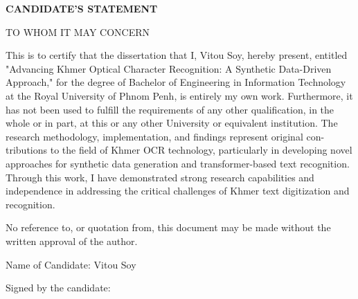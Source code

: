 \begin{adjustwidth}{0.2cm}{0.2cm}

\begin{center}
    {\englishfont\fontsize{14pt}{21pt}\selectfont \textbf{CANDIDATE'S STATEMENT} \par}
\end{center}
\label{candidate-statement}

\vspace{1cm}
{\englishfont\fontsize{12pt}{18pt}\selectfont \setlength{\parindent}{0pt} TO WHOM IT MAY CONCERN \par}

\vspace{0.5cm}
    \setlength{\parindent}{0pt}
    {\large This is to certify that the dissertation that I, Vitou Soy, hereby present, entitled "Advancing
    Khmer Optical Character Recognition: A Synthetic Data-Driven Approach," for the degree
    of Bachelor of Engineering in Information Technology at the Royal University of Phnom Penh, is
    entirely my own work. Furthermore, it has not been used to fulfill the requirements of any
    other qualification, in the whole or in part, at this or any other University or equivalent
    institution. The research methodology, implementation, and findings represent original con-
    tributions to the field of Khmer OCR technology, particularly in developing novel approaches
    for synthetic data generation and transformer-based text recognition. Through this work, I
    have demonstrated strong research capabilities and independence in addressing the critical
    challenges of Khmer text digitization and recognition.\par}

    \vspace{0.5cm}
    \setlength{\parindent}{0pt}
    {\large No reference to, or quotation from, this document may be made without the written
    approval of the author.\par}
    \vspace{1cm}
    \setlength{\parindent}{0pt}
    {\large Name of Candidate: Vitou Soy\par}
    
    \vspace{0.5cm}
    \setlength{\parindent}{0pt}
    {\large Signed by the candidate: \hspace{1cm}\hspace{\fill}\par}
    

\end{adjustwidth}
